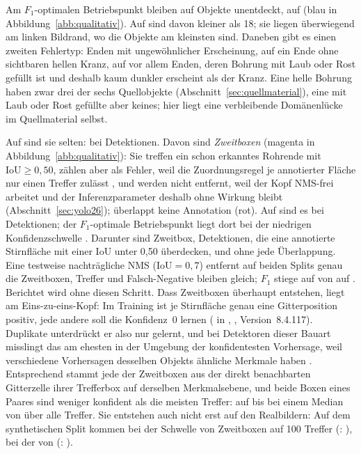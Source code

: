  Am $F_1$-optimalen Betriebspunkt bleiben auf
 \zfnTest{} Objekte unentdeckt, auf  \zfnVal{} (blau in
Abbildung~\ref{abb:qualitativ}). Auf
 sind \zfnKleinTest{} davon kleiner als 18\px; sie liegen
überwiegend am linken Bildrand, wo die Objekte am kleinsten sind. Daneben gibt
es einen zweiten Fehlertyp: Enden mit ungewöhnlicher Erscheinung, auf
 ein Ende ohne sichtbaren hellen Kranz, auf  vor allem
Enden, deren Bohrung mit Laub oder Rost gefüllt ist und deshalb kaum dunkler
erscheint als der Kranz. Eine helle Bohrung haben zwar drei der sechs
Quellobjekte (Abschnitt~\ref{sec:quellmaterial}), eine mit Laub oder Rost
gefüllte aber keines; hier liegt eine verbleibende Domänenlücke im
Quellmaterial selbst.

\label{sec:falschpositive} Auf  sind sie selten: \zfpTest{} bei
\znPredTest{} Detektionen. Davon sind \zfpDoppelTest{} \emph{Zweitboxen}
(magenta in Abbildung~\ref{abb:qualitativ}): Sie
treffen ein schon erkanntes Rohrende mit $\mathrm{IoU} \geq 0{,}50$, zählen
aber als Fehler, weil die Zuordnungsregel je annotierter Fläche nur einen
Treffer zulässt \parencite{lin2014coco}, und werden nicht entfernt, weil der Kopf
NMS-frei arbeitet und der Inferenzparameter  deshalb ohne Wirkung
bleibt (Abschnitt~\ref{sec:yolo26}); \zfpOhneTest{} überlappt keine
Annotation (rot). Auf  sind es \zfpVal{} bei \znPredVal{} Detektionen; der
$F_1$-optimale Betriebspunkt liegt dort bei der niedrigen Konfidenzschwelle
\zrefValConf. Darunter sind \zfpDoppelVal{} Zweitbox, \zfpTeilVal{} Detektionen,
die eine annotierte Stirnfläche mit einer IoU unter 0{,}50 überdecken, und
\zfpOhneVal{} ohne jede Überlappung. Eine testweise nachträgliche NMS
($\mathrm{IoU} = 0{,}7$) entfernt auf beiden Splits genau die Zweitboxen,
Treffer und Falsch-Negative bleiben gleich;
$F_1$ stiege auf  von \znmsTestFfOhne{} auf \znmsTestFfMit.
Berichtet wird ohne diesen Schritt.
Dass Zweitboxen überhaupt entstehen, liegt am Eins-zu-eins-Kopf: Im Training
ist je Stirnfläche genau eine Gitterposition positiv, jede andere soll die
Konfidenz~0 lernen ( in ,
, Version~8.4.117). Duplikate unterdrückt er
also nur gelernt, und bei Detektoren dieser Bauart misslingt das am ehesten in
der Umgebung der konfidentesten Vorhersage, weil verschiedene Vorhersagen
desselben Objekts ähnliche Merkmale haben \parencite{wang2021defcn}.
Entsprechend stammt jede der \zzbAnzahl{} Zweitboxen aus der direkt
benachbarten Gitterzelle ihrer Trefferbox auf derselben Merkmalsebene, und beide
Boxen eines Paares sind weniger konfident als die meisten Treffer: auf
 \zzbTestConfMin{} bis \zzbTestConfMax{} bei einem Median von
\zzbTestTpConf{} über alle Treffer. Sie entstehen auch nicht erst auf den
Realbildern: Auf dem synthetischen Split  kommen bei der Schwelle von
 \zzbSvalTestRate{} Zweitboxen auf 100 Treffer (:
\zzbTestRate), bei der von  \zzbSvalValRate{} (:
\zzbValRate).

